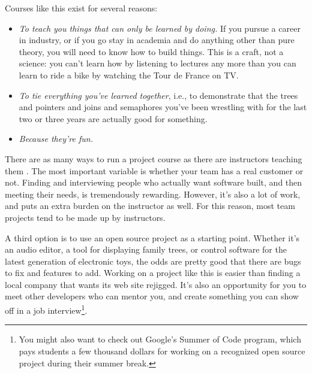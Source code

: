 \documentclass{report}
\begin{document}
Courses like this exist for several reasons:

\begin{itemize}

  \item \emph{To teach you things that can only be learned by doing.}
  If you pursue a career in industry, or if you go stay in academia
  and do anything other than pure theory, you will need to know how to
  build things.  This is a craft, not a science: you can't learn how
  by listening to lectures any more than you can learn to ride a bike
  by watching the Tour de France on TV.

  \item \emph{To tie everything you've learned together}, i.e., to
  demonstrate that the trees and pointers and joins and semaphores
  you've been wrestling with for the last two or three years are
  actually good for something.

  \item \emph{Because they're fun.}  

\end{itemize}

There are as many ways to run a project course as there are
instructors teaching them \cite{b:petre-projects}.  The most important
variable is whether your team has a real customer or not.  Finding and
interviewing people who actually want software built, and then meeting
their needs, is tremendously rewarding.  However, it's also a lot of
work, and puts an extra burden on the instructor as well.  For this
reason, most team projects tend to be made up by instructors.

A third option is to use an open source project as a starting point.
Whether it's an audio editor, a tool for displaying family trees, or
control software for the latest generation of electronic toys, the
odds are pretty good that there are bugs to fix and features to add.
Working on a project like this is easier than finding a local company
that wants its web site rejigged.  It's also an opportunity for you to
meet other developers who can mentor you, and create something you can
show off in a job interview\footnote{You might also want to check out
Google's Summer of Code program, which pays students a few thousand
dollars for working on a recognized open source project during their
summer break.}.

\end{document}
